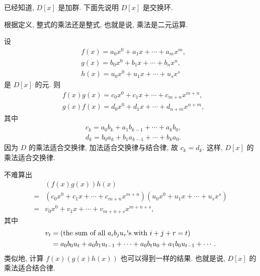\begin{pf}
    已经知道, $D[x]$ 是加群. 下面先说明 $D[x]$ 是交换环.

    根据定义, 整式的乘法还是整式, 也就是说, 乘法是二元运算.

    设
    \begin{align*}
         & f(x) = a_0 x^0 + a_1 x + \cdots + a_m x^m, \\
         & g(x) = b_0 x^0 + b_1 x + \cdots + b_n x^n, \\
         & h(x) = u_0 x^0 + u_1 x + \cdots + u_s x^s
    \end{align*}
    是 $D[x]$ 的元. 则
    \begin{align*}
         & f(x) g(x) = c_0 x^0 + c_1 x + \cdots + c_{m+n} x^{m+n}, \\
         & g(x) f(x) = d_0 x^0 + d_1 x + \cdots + d_{n+m} x^{n+m},
    \end{align*}
    其中
    \begin{align*}
         & c_k = a_0 b_k + a_1 b_{k-1} + \cdots + a_k b_0, \\
         & d_k = b_0 a_k + b_1 a_{k-1} + \cdots + b_k a_0.
    \end{align*}
    因为 $D$ 的乘法适合交换律, 加法适合交换律与结合律, 故 $c_k = d_k$. 这样, $D[x]$ 的乘法适合交换律.

    不难算出
    \begin{align*}
             & (f(x) g(x)) h(x)                                                                  \\
        = {} & (c_0 x^0 + c_1 x + \cdots + c_{m+n} x^{m+n}) (u_0 x^0 + u_1 x + \cdots + u_s x^s) \\
        = {} & v_0 x^0 + v_1 x + \cdots + v_{m+n+s} x^{m+n+s},
    \end{align*}
    其中
    \begin{align*}
        v_t
        = {} & (\text{the sum of all $a_i b_j u_r$\apostrophe s with $i+j+r=t$})                \\
        = {} & a_0 b_0 u_t + a_0 b_1 u_{t-1} + \cdots + a_0 b_t u_0 + a_1 b_0 u_{t-1} + \cdots.
    \end{align*}
    类似地, 计算 $f(x) (g(x) h(x))$ 也可以得到一样的结果. 也就是说, $D[x]$ 的乘法适合结合律.


\end{pf}

